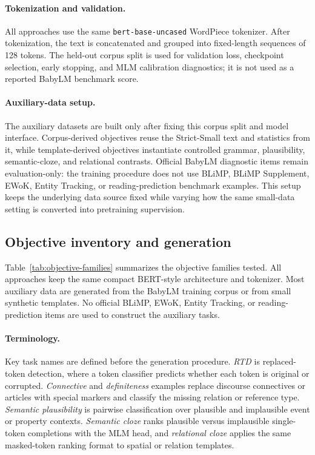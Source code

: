 \documentclass[11pt]{article}
\begin{document}
\paragraph{Tokenization and validation.}
All approaches use the same \texttt{bert-base-uncased} WordPiece tokenizer.
After tokenization, the text is concatenated and grouped into fixed-length sequences of 128 tokens.
The held-out corpus split is used for validation loss, checkpoint selection, early stopping, and MLM calibration diagnostics; it is not used as a reported BabyLM benchmark score.

\paragraph{Auxiliary-data setup.}
The auxiliary datasets are built only after fixing this corpus split and model interface.
Corpus-derived objectives reuse the Strict-Small text and statistics from it, while template-derived objectives instantiate controlled grammar, plausibility, semantic-cloze, and relational contrasts.
Official BabyLM diagnostic items remain evaluation-only: the training procedure does not use BLiMP, BLiMP Supplement, EWoK, Entity Tracking, or reading-prediction benchmark examples.
This setup keeps the underlying data source fixed while varying how the same small-data setting is converted into pretraining supervision.

\subsection{Objective inventory and generation}

Table~\ref{tab:objective-families} summarizes the objective families tested.
All approaches keep the same compact BERT-style architecture and tokenizer.
Most auxiliary data are generated from the BabyLM training corpus or from small synthetic templates.
No official BLiMP, EWoK, Entity Tracking, or reading-prediction items are used to construct the auxiliary tasks.



\paragraph{Terminology.}
Key task names are defined before the generation procedure.
\textit{RTD} is replaced-token detection, where a token classifier predicts whether each token is original or corrupted.
\textit{Connective} and \textit{definiteness} examples replace discourse connectives or articles with special markers and classify the missing relation or reference type.
\textit{Semantic plausibility} is pairwise classification over plausible and implausible event or property contexts.
\textit{Semantic cloze} ranks plausible versus implausible single-token completions with the MLM head, and \textit{relational cloze} applies the same masked-token ranking format to spatial or relation templates.
\end{document}
